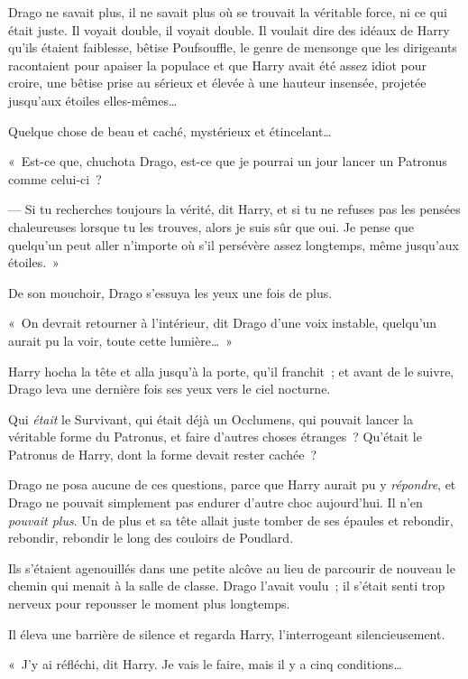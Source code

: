 Drago ne savait plus, il ne savait plus où se trouvait la véritable force, ni ce qui était juste. Il voyait double, il voyait double. Il voulait dire des idéaux de Harry qu'ils étaient faiblesse, bêtise Poufsouffle, le genre de mensonge que les dirigeants racontaient pour apaiser la populace et que Harry avait été assez idiot pour croire, une bêtise prise au sérieux et élevée à une hauteur insensée, projetée jusqu'aux étoiles elles-mêmes…

Quelque chose de beau et caché, mystérieux et étincelant…

«~Est-ce que, chuchota Drago, est-ce que je pourrai un jour lancer un Patronus comme celui-ci~?

--- Si tu recherches toujours la vérité, dit Harry, et si tu ne refuses pas les pensées chaleureuses lorsque tu les trouves, alors je suis sûr que oui. Je pense que quelqu'un peut aller n'importe où s'il persévère assez longtemps, même jusqu'aux étoiles.~»

De son mouchoir, Drago s'essuya les yeux une fois de plus.

«~On devrait retourner à l'intérieur, dit Drago d'une voix instable, quelqu'un aurait pu la voir, toute cette lumière…~»

Harry hocha la tête et alla jusqu'à la porte, qu'il franchit~; et avant de le suivre, Drago leva une dernière fois ses yeux vers le ciel nocturne.

Qui \emph{était} le Survivant, qui était déjà un Occlumens, qui pouvait lancer la véritable forme du Patronus, et faire d'autres choses étranges~? Qu'était le Patronus de Harry, dont la forme devait rester cachée~?

Drago ne posa aucune de ces questions, parce que Harry aurait pu y \emph{répondre}, et Drago ne pouvait simplement pas endurer d'autre choc aujourd'hui. Il n'en \emph{pouvait plus}. Un de plus et sa tête allait juste tomber de ses épaules et rebondir, rebondir, rebondir le long des couloirs de Poudlard.

\later

Ils s'étaient agenouillés dans une petite alcôve au lieu de parcourir de nouveau le chemin qui menait à la salle de classe. Drago l'avait voulu~; il s'était senti trop nerveux pour repousser le moment plus longtemps.

Il éleva une barrière de silence et regarda Harry, l'interrogeant silencieusement.

«~J'y ai réfléchi, dit Harry. Je vais le faire, mais il y a cinq conditions…

